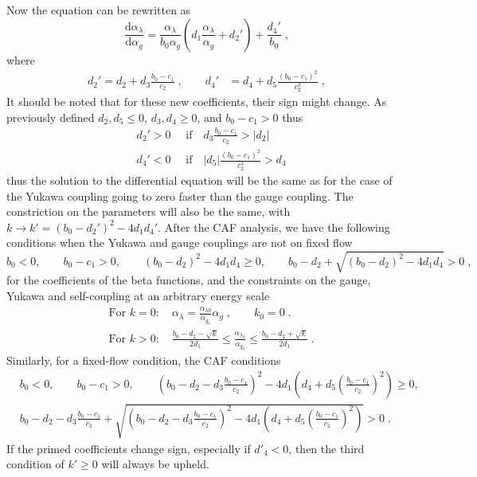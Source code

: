 Now the equation can be rewritten as
\begin{equation}
    \frac{\text{d} \alpha_\lambda}{\text{d}\alpha_g}=\frac{\alpha_\lambda}{b_0\alpha_g}\left(d_1\frac{\alpha_\lambda}{\alpha_g} + d_2'\right)+\frac{d_4'}{b_0}\;,
\end{equation}
where 
\begin{align}
    d_2'=d_2+d_3\frac{b_0-c_1}{c_2}\;,\quad\quad d_4'&={d_4}+d_5\frac{(b_0-c_1)^2}{c_2^2}\;,
\end{align}
It should be noted that for these new coefficients, their sign might change. As previously defined $d_2,d_5\le 0$,  $d_3,d_4\ge0$, and $b_0-c_1>0$ thus
\begin{align}
     &d_2'>0 \quad \text{  if}\quad d_3\frac{b_0-c_1}{c_2}>|d_2|
     \\&d_4'<0 \quad \text{  if}\quad |d_5|\frac{(b_0-c_1)^2}{c_2^2}>d_4
\end{align}
thus the solution to the differential equation will be the same as for the case of the Yukawa coupling going to zero faster than the gauge coupling. The constriction on the parameters will also be the same, with $k\to k'=(b_0-d_2')^2-4d_1d_4'$.
After the CAF analysis, we have the following conditions when the Yukawa and gauge couplings are not on fixed flow
\begin{equation}
    b_0<0,\quad\quad b_0-c_1>0,\quad\quad (b_0-d_2)^2-4d_1d_4\geq 0,\quad\quad b_0-d_2+\sqrt{(b_0-d_2)^2-4d_1d_4}>0\;,
\end{equation}
for the coefficients of the beta functions, and the constraints on the gauge, Yukawa and self-coupling at an arbitrary energy scale 
\begin{align}
    &\text{For }k=0: \quad \alpha_{\lambda} = \frac{ \alpha_{\lambda0}  }{ \alpha_{g_0}  } \alpha_g\;,\quad\quad k_0=0\;.\\&
    \text{For }k>0: \quad 
    \frac{b_0-d_2-\sqrt{k}}{2d_1}\le \frac{\alpha_{\lambda_0}}{\alpha_{g_0}}\le \frac{b_0-d_2+\sqrt{k}}{2d_1}\;. 
\end{align}
Similarly, for a fixed-flow condition, the CAF conditions 
\begin{align}
    &b_0<0,\quad\quad b_0-c_1>0,\quad\quad \left(b_0-d_2-d_3\frac{b_0-c_1}{c_2}\right)^2-4d_1\left(d_4+d_5\left(\frac{b_0-c_1}{c_2}\right)^2\right)\geq 0,\\&b_0-d_2- d_3 \frac{b_0-c_1}{c_2}+\sqrt{\left(b_0-d_2 - d_3 \frac{b_0-c_1}{c_2}\right)^2-4d_1\left(d_4+d_5\left(\frac{b_0-c_1}{c_2}\right)^2\right)}>0\;.
\end{align}  
If the primed coefficients change sign, especially if $d'_4<0$, then the third condition of $k'\ge0$ will always be upheld. 
